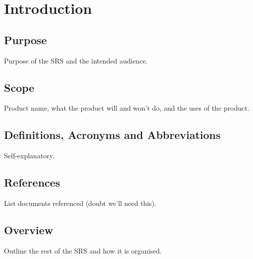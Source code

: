 \section{Introduction}
	\subsection{Purpose}

	Purpose of the SRS and the intended audience.
	\subsection{Scope}
	Product name, what the product will and won't do, and the uses of the product.
	\subsection{Definitions, Acronyms and Abbreviations}
	Self-explanatory.
	\subsection{References}
	List documents referenced (doubt we'll need this).
	\subsection{Overview}
	Outline the rest of the SRS and how it is organised.